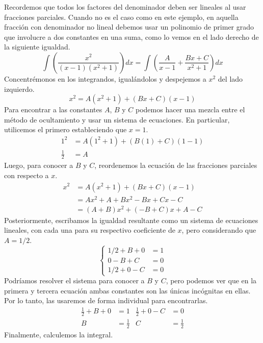 \documentclass[12pt]{article}
\begin{document}
Recordemos que todos los factores del denominador deben ser lineales al usar fracciones parciales. Cuando no es el caso como en este ejemplo, en aquella fracción con denominador no lineal debemos usar un polinomio de primer grado que involucre a dos constantes en una suma, como lo vemos en el lado derecho de la siguiente igualdad.
\[
  \int \left(\frac{x^{2}}{(x - 1)(x^{2} + 1)}\right) dx = \int \left(\frac{A}{x - 1} + \frac{Bx + C}{x^{2} + 1}\right) dx
\]
Concentrémonos en los integrandos, igualándolos y despejemos a $x^{2}$ del lado izquierdo.
\[
  x^{2} = A(x^{2} + 1) + (Bx + C)(x - 1)
\]
Para encontrar a las constantes $A$, $B$ y $C$ podemos hacer una mezcla entre el método de ocultamiento y usar un sistema de ecuaciones. En particular, utilicemos el primero estableciendo que $x = 1$.
\begin{align*}
  1^{2} &= A(1^{2} + 1) + (B(1) + C)(1 - 1) \\
  \frac{1}{2} &= A
\end{align*}
Luego, para conocer a $B$ y $C$, reordenemos la ecuación de las fracciones parciales con respecto a $x$.
\begin{align*}
x^{2} &= A(x^{2} + 1) + (Bx + C)(x - 1) \\
      &= Ax^{2} + A + Bx^{2} - Bx + Cx - C \\
      &= (A + B)x^{2} + (-B + C)x + A - C
\end{align*}
Posteriormente, escribamos la igualdad resultante como un sistema de ecuaciones lineales, con cada una para su respectivo coeficiente de $x$, pero considerando que $A = 1/2$.
\[
\left\{
\begin{aligned}
1/2 + B + 0 &= 1 \\
  0 - B + C &= 0 \\
1/2 + 0 - C &= 0
\end{aligned}
\right.
\]
Podríamos resolver el sistema para conocer a $B$ y $C$, pero podemos ver que en la primera y tercera ecuación ambas constantes son las únicas incógnitas en ellas. Por lo tanto, las usaremos de forma individual para encontrarlas.
\begin{align*}
  \frac{1}{2} + B + 0 &= 1 & \frac{1}{2} + 0 - C &= 0 \\
                    B &= \frac{1}{2}      &    C &= \frac{1}{2}
\end{align*}
Finalmente, calculemos la integral.
\end{document}
